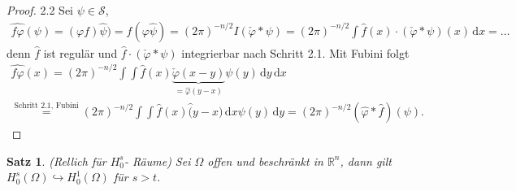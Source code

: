 \documentclass[
paper=a4,
bibtotocnumbered,
liststotocnumbered,
tablecaptionabove,
pointlessnumbers,
twoside,
openright,
10pt
]
{report}
\let\phi\varphi
\newtheorem{satz}[thm]{Satz}
\theoremstyle{definition}
\numberwithin{equation}{chapter}
\begin{document}
\begin{proof}
2.2 Sei  $\psi\in \mathcal S$,
\begin{gather}
\widehat{f\phi}(\psi) = (\phi f) \hat \psi) = f(\phi \hat \psi) = (2\pi)^{-n/2} I(\check \phi * \psi) = (2\pi)^{-n/2} \int \hat f(x) \cdot (\check \phi * \psi)(x) \, \mathrm dx =\ldots
\end{gather}
denn  $\hat f$ ist regulär und $\hat f \cdot (\check \phi * \psi)$ integrierbar nach Schritt 2.1. Mit Fubini folgt
\begin{gather}
\widehat{f\phi} (x) = (2\pi)^{-n/2} \int\int \hat f(x) \underbrace{\check \phi(x-y)}_{=\hat \phi(y-x)} \psi(y) \, \mathrm dy \, \mathrm dx\\
\stackrel{\text{Schritt 2.1}, \text{ Fubini}}= (2\pi)^{-n/2}\int \int \hat f(x) \hat (y-x) \, \mathrm dx \psi(y) \, \mathrm dy = (2\pi)^{-n/2} (\hat \phi * \hat f)(\psi).
\end{gather}
\end{proof}

\begin{satz}(Rellich für $H_0^s$- Räume)
Sei $\Omega$ offen und beschränkt in $\mathbb R^n$, dann gilt $H_0^s(\Omega) \hookrightarrow H_0^1(\Omega)$ für $s>t$.
\end{satz}
\end{document}
